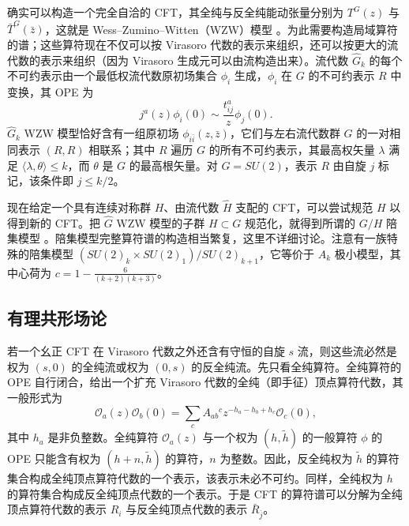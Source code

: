 确实可以构造一个完全自洽的 CFT，其全纯与反全纯能动张量分别为 $T^G(z)$ 与 $\bar T^G(\bar z)$，这就是 Wess–Zumino–Witten（WZW）模型 \cite{r21,r22}。为此需要构造局域算符的谱；这些算符现在不仅可以按 Virasoro 代数的表示来组织，还可以按更大的流代数的表示来组织（因为 Virasoro 生成元可以由流构造出来）。流代数 $\hat G_k$ 的每个不可约表示由一个最低权流代数原初场集合 $\phi_i$ 生成，$\phi_i$ 在 $G$ 的不可约表示 $R$ 中变换，其 OPE 为
\begin{equation}
  \label{eq:4-15}
  j^a(z)\phi_i(0)\sim\frac{t^a_{ij}}{z}\phi_j(0).
\end{equation}
$\hat G_k$ WZW 模型恰好含有一组原初场 $\phi_{i\bar i}(z,\bar z)$，它们与左右流代数群 $G$ 的一对相同表示 $(R,R)$ 相联系；其中 $R$ 遍历 $G$ 的所有不可约表示，其最高权矢量 $\lambda$ 满足 $\langle\lambda,\theta\rangle\le k$，而 $\theta$ 是 $G$ 的最高根矢量。对 $G=SU(2)$，表示 $R$ 由自旋 $j$ 标记，该条件即 $j\le k/2$。


现在给定一个具有连续对称群 $H$、由流代数 $\hat H$ 支配的 CFT，可以尝试规范 $H$ 以得到新的 CFT。把 $\hat G$ WZW 模型的子群 $H\subset G$ 规范化，就得到所谓的 $G/H$ 陪集模型 \cite{r23,r24}。陪集模型完整算符谱的构造相当繁复，这里不详细讨论。注意有一族特殊的陪集模型 $(SU(2)_k\times SU(2)_1)/SU(2)_{k+1}$，它等价于 $A_k$ 极小模型，其中心荷为 $c=1-\frac{6}{(k+2)(k+3)}$。


\subsection{有理共形场论}\label{sec:4-4}

若一个幺正 CFT 在 Virasoro 代数之外还含有守恒的自旋 $s$ 流，则这些流必然是权为 $(s,0)$ 的全纯流或权为 $(0,s)$ 的反全纯流。先只看全纯算符。全纯算符的 OPE 自行闭合，给出一个扩充 Virasoro 代数的全纯（即手征）顶点算符代数，其一般形式为
\begin{equation}
  \label{eq:4-16}
  \mathcal{O}_a(z)\mathcal{O}_b(0)=\sum_c A_{ab}{}^c z^{-h_a-h_b+h_c}\mathcal{O}_c(0),
\end{equation}
其中 $h_a$ 是非负整数。全纯算符 $\mathcal{O}_a(z)$ 与一个权为 $(h,\tilde h)$ 的一般算符 $\phi$ 的 OPE 只能含有权为 $(h+n,\tilde h)$ 的算符，$n$ 为整数。因此，反全纯权为 $\tilde h$ 的算符集合构成全纯顶点算符代数的一个表示，该表示未必不可约。同样，全纯权为 $h$ 的算符集合构成反全纯顶点代数的一个表示。于是 CFT 的算符谱可以分解为全纯顶点算符代数的表示 $R_i$ 与反全纯顶点代数的表示 $\bar R_{\bar j}$。

